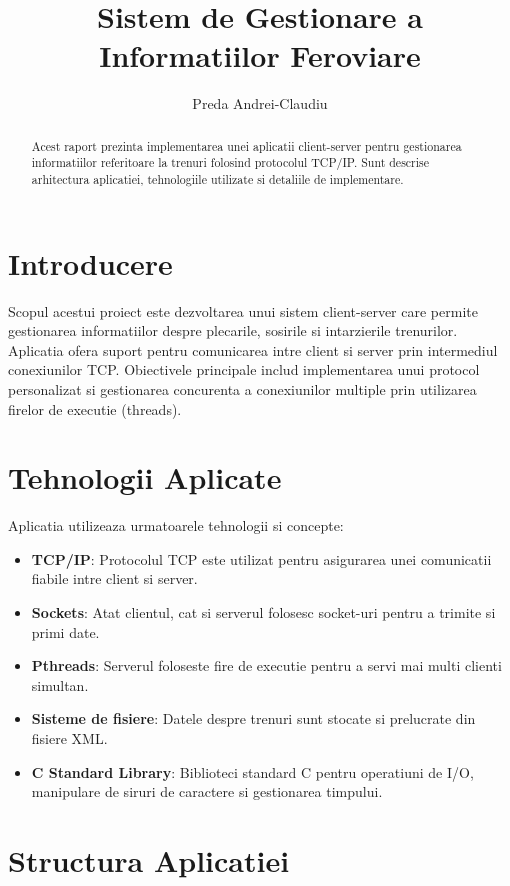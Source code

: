 \documentclass[runningheads]{llncs}
\title{Sistem de Gestionare a Informatiilor Feroviare}
\author{Preda Andrei-Claudiu\orcidID{2A2}}
\institute{{Universitatea "Alexandru Ioan Cuza" Iasi,\\
Facultatea de Informatica}\\
\email andrei.foco@yahoo.com}
\begin{document}
\maketitle

\begin{abstract}
Acest raport prezinta implementarea unei aplicatii client-server pentru gestionarea informatiilor referitoare la trenuri folosind protocolul TCP/IP. Sunt descrise arhitectura aplicatiei, tehnologiile utilizate si detaliile de implementare.
\end{abstract}

\section{Introducere}
Scopul acestui proiect este dezvoltarea unui sistem client-server care permite gestionarea informatiilor despre plecarile, sosirile si intarzierile trenurilor. Aplicatia ofera suport pentru comunicarea intre client si server prin intermediul conexiunilor TCP. Obiectivele principale includ implementarea unui protocol personalizat si gestionarea concurenta a conexiunilor multiple prin utilizarea firelor de executie (threads).

\section{Tehnologii Aplicate}
Aplicatia utilizeaza urmatoarele tehnologii si concepte:
\begin{itemize}
    \item \textbf{TCP/IP}: Protocolul TCP este utilizat pentru asigurarea unei comunicatii fiabile intre client si server.
    \item \textbf{Sockets}: Atat clientul, cat si serverul folosesc socket-uri pentru a trimite si primi date.
    \item \textbf{Pthreads}: Serverul foloseste fire de executie pentru a servi mai multi clienti simultan.
    \item \textbf{Sisteme de fisiere}: Datele despre trenuri sunt stocate si prelucrate din fisiere XML.
    \item \textbf{C Standard Library}: Biblioteci standard C pentru operatiuni de I/O, manipulare de siruri de caractere si gestionarea timpului.
\end{itemize}

\section{Structura Aplicatiei}
\end{document}
